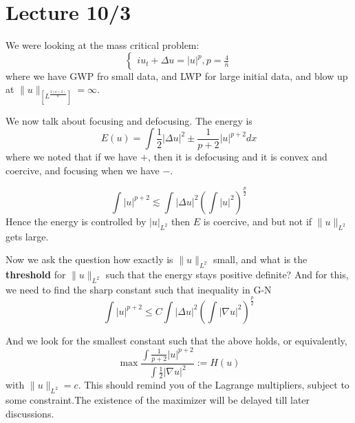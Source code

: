 \section{Lecture 10/3}
We were looking at the mass critical problem:
\begin{equation*}
    \begin{cases}
        i u_t+\Delta u=|u|^p, p=\frac{4}{n}
    \end{cases}
\end{equation*}
where we have GWP fro small data, and LWP for large initial data, and blow up at $\|u\|_[L^\frac{2(n+2)}{n}]=\infty$. 

We now talk about focusing and defocusing. The energy is
\begin{equation*}
    E(u)=\int \frac{1}{2}|\Delta u|^2\pm \frac{1}{p+2}|u|^{p+2}dx
\end{equation*}
where we noted that if we have $+$, then it is defocusing and it is convex and coercive, and focusing when we have $-$.

\begin{equation*}
    \int|u|^{p+2}\lesssim \int |\Delta u|^2\left(\int|u|^2\right)^\frac{p}{2}
\end{equation*}
Hence the energy is controlled by $|u|_{L^2}$ then $E$ is coercive, and but not if $\|u\|_{L^2}$ gets large.

Now we ask the question how exactly is $\|u\|_{L^2}$ small, and what is the \textbf{threshold} for $\|u\|_{L^2}$ such that the energy stays positive definite? And for this, we need to find the sharp constant such that inequality in G-N
\begin{equation*}
    \int|u|^{p+2}\leq C\int|\Delta u|^2\left(\int|\nabla u|^2 \right)^\frac{p}{2}
\end{equation*}

And we look for the smallest constant such that the above holds, or equivalently,
\begin{equation*}
    \max\frac{\int\frac{1}{p+2}|u|^{p+2}}{\int\frac{1}{2}|\nabla u|^2}:=H(u)
\end{equation*} 
with $\|u\|_{L^2}=c$. This should remind you of the Lagrange multipliers, subject to some constraint.The existence of the maximizer will be delayed till later discussions.

